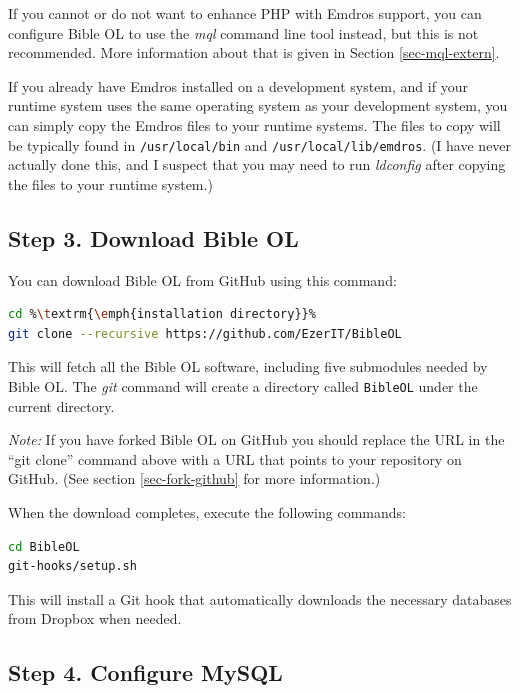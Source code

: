 \documentclass[11pt,oneside,a4paper]{memoir}
\begin{document}
If you cannot or do not want to enhance PHP with Emdros support, you can configure Bible OL to use
the \emph{mql} command line tool instead, but this is not recommended. More information
about that is given in Section \ref{sec-mql-extern}.

If you already have Emdros installed on a development system, and if your runtime system uses the
same operating system as your development system, you can simply copy the Emdros files to your
runtime systems. The files to copy will be typically found in \texttt{/usr/local/bin} and
\texttt{/usr/local/lib/emdros}. (I have never actually done this, and I suspect that you may need to
run \emph{ldconfig} after copying the files to your runtime system.)


\subsection{Step 3. Download Bible OL}\label{sec-download-bol}

You can download Bible OL from GitHub using this command:

\begin{lstlisting}[language=bash]
cd %\textrm{\emph{installation directory}}%
git clone --recursive https://github.com/EzerIT/BibleOL
\end{lstlisting}

This will fetch all the Bible OL software, including five submodules needed by Bible OL. The
\emph{git} command will create a directory called \texttt{BibleOL} under the current directory.

\emph{Note:} If you have forked Bible OL on GitHub you should replace the URL in the ``git clone''
command above with a URL that points to your repository on GitHub. (See section
\ref{sec-fork-github} for more information.)

When the download completes, execute the following commands:

\begin{lstlisting}[language=bash]
cd BibleOL
git-hooks/setup.sh
\end{lstlisting}

This will install a Git hook that automatically downloads the necessary databases
from Dropbox when needed.


\subsection{Step 4. Configure MySQL}
\end{document}
